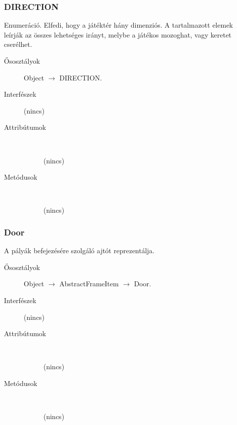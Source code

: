		\subsubsection{DIRECTION}
				 Enumeráció. Elfedi, hogy a játéktér hány dimenziós.  A tartalmazott elemek leírják az összes lehetséges irányt,   melybe a játékos mozoghat, vagy keretet cserélhet.  			\begin{description}


				\item[Ősosztályok] Object $\rightarrow{}$ DIRECTION.
				\item[Interfészek] (nincs)
				\item[Attribútumok]$\ $
					\begin{description}
						\item[] (nincs)
					\end{description}
				\item[Metódusok]$\ $
					\begin{description}
						\item[] (nincs)
					\end{description}
			\end{description}

		\subsubsection{Door}
				 A pályák befejezésére szolgáló ajtót reprezentálja. 			\begin{description}


				\item[Ősosztályok] Object $\rightarrow{}$ AbstractFrameItem $\rightarrow{}$ Door.
				\item[Interfészek] (nincs)
				\item[Attribútumok]$\ $
					\begin{description}
						\item[] (nincs)
					\end{description}
				\item[Metódusok]$\ $
					\begin{description}
						\item[] (nincs)
					\end{description}
			\end{description}

